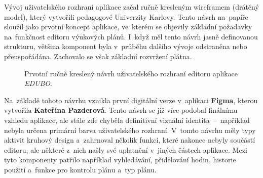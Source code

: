 \documentclass[male,czech,api_bc]{kitheses}
\begin{document}
Vývoj uživatelského rozhraní aplikace začal ručně kresleným wireframem (drátěný model), který vytvořili pedagogové Univerzity Karlovy. Tento návrh na~papíře sloužil jako prvotní koncept aplikace, ve~kterém se objevily základní požadavky na~funkčnost editoru výukových plánů. I~když měl tento návrh jasně definovanou strukturu, většina komponent byla v~průběhu dalšího vývoje odstraněna nebo přeuspořádána. Zachovalo se však základní rozvržení plátna.

\begin{figure}[H]
	\centering
	\caption{Prvotní ručně kreslený návrh uživatelského rozhraní editoru aplikace \textit{EDUBO}.}
	\label{fig:edubo-navrh-1}
\end{figure}

Na~základě tohoto návrhu vznikla první digitální verze v~aplikaci \textbf{Figma}, kterou vytvořila \textbf{Kateřina Pazderová}. Tento návrh se již více podobal finálnímu vzhledu aplikace, ale stále zde chyběla definitivní vizuální identita~--~například nebyla určena primární barva uživatelského rozhraní. V~tomto návrhu měly typy aktivit kruhový design a~zahrnoval několik funkcí, které nakonec nebyly součástí editoru, ale některé z~nich našly své uplatnění v~jiných částech aplikace. Mezi tyto komponenty patřilo například vyhledávání, přidělování hodin, historie použití a~funkce pro kontrolu plánu a~typ plánu.
\end{document}
